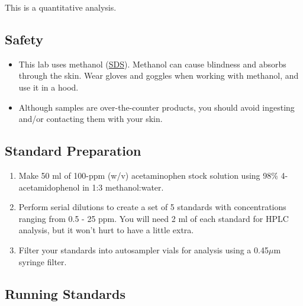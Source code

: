 \documentclass[]{tufte-book}
\providecommand{\tightlist}{%
  \setlength{\itemsep}{0pt}\setlength{\parskip}{0pt}}
\begin{document}
This is a quantitative analysis.

\hypertarget{safety}{%
\subsection*{Safety}\label{safety}}

\begin{itemize}
\tightlist
\item
  This lab uses methanol (\href{http://www.sciencelab.com/msds.php?msdsId=9927227}{SDS}). Methanol can cause blindness and absorbs through the skin. Wear gloves and goggles when working with methanol, and use it in a hood.\\
\item
  Although samples are over-the-counter products, you should avoid ingesting and/or contacting them with your skin.
\end{itemize}

\hypertarget{standard-preparation}{%
\subsection{Standard Preparation}\label{standard-preparation}}

\begin{enumerate}
\def\labelenumi{\arabic{enumi}.}
\tightlist
\item
  Make 50 ml of 100-ppm (w/v) acetaminophen stock solution using 98\% 4-acetamidophenol in 1:3 methanol:water.
\item
  Perform serial dilutions to create a set of 5 standards with concentrations ranging from 0.5 - 25 ppm. You will need 2 ml of each standard for HPLC analysis, but it won't hurt to have a little extra.
\item
  Filter your standards into autosampler vials for analysis using a 0.45\(\mu\)m syringe filter.
\end{enumerate}

\hypertarget{running-standards}{%
\subsection{Running Standards}\label{running-standards}}
\end{document}
